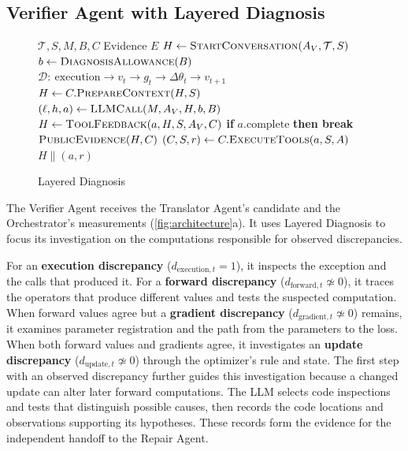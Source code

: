 \subsection{Verifier Agent with Layered Diagnosis}
\label{sec:hierarchy}
{
\setlength{\intextsep}{0pt}
\begin{figure}
\begin{minipage}{\linewidth}
\begin{algorithm}[H]
\caption{Layered Diagnosis}
\label{alg:diagnose}
\raggedright
\small
\begin{algorithmic}[1]
\Require $\mathcal T,S,M,B,C$
\Ensure Evidence $E$
  \State $H\gets\Call{StartConversation}{A_V,\mathcal T,S}$
  \State $b\gets\Call{DiagnosisAllowance}{B}$
  \State $\mathcal D:\ \mathrm{execution}\to v_t\to g_t\to\Delta\theta_t\to v_{t+1}$
    \State $H\gets C.\Call{PrepareContext}{H,S}$
    \State $(\ell,h,a)\gets\Call{LLMCall}{M,A_V,H,b,B}$
    \State $H\gets\Call{ToolFeedback}{a,H,S,A_V,C}$
    \State \textbf{if} $a.\mathrm{complete}$ \textbf{then break}
  \EndWhile
  \State \Return $\Call{PublicEvidence}{H,C}$
\EndFunction
{}
  \State $(C,S,r)\gets C.\Call{ExecuteTools}{a,S,A}$
  \State \Return $H\mathbin{\|}(a,r)$
\EndFunction
\end{algorithmic}
\end{algorithm}
\end{minipage}
\end{figure}
The Verifier Agent receives the Translator Agent's candidate and the Orchestrator's measurements (\cref{fig:architecture}a). It uses Layered Diagnosis to focus its investigation on the computations responsible for observed discrepancies.

For an \textbf{execution discrepancy} ($d_{\mathrm{execution},t}=1$), it inspects the exception and the calls that produced it. For a \textbf{forward discrepancy} ($d_{\mathrm{forward},t}\not\simeq0$), it traces the operators that produce different values and tests the suspected computation. When forward values agree but a \textbf{gradient discrepancy} ($d_{\mathrm{gradient},t}\not\simeq0$) remains, it examines parameter registration and the path from the parameters to the loss. When both forward values and gradients agree, it investigates an \textbf{update discrepancy} ($d_{\mathrm{update},t}\not\simeq0$) through the optimizer's rule and state. The first step with an observed discrepancy further guides this investigation because a changed update can alter later forward computations. The LLM selects code inspections and tests that distinguish possible causes, then records the code locations and observations supporting its hypotheses. These records form the evidence for the independent handoff to the Repair Agent.

}
